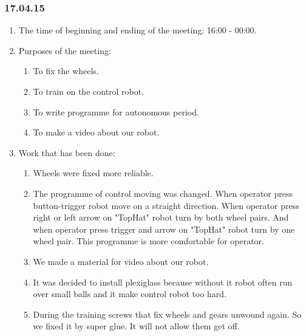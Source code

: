 \subsubsection{17.04.15}
\begin{enumerate}
	
	\item The time of beginning and ending of the meeting: 16:00 - 00:00.
	
	\item Purposes of the meeting: 
	\begin{enumerate}
		
		\item To fix the wheels.
		
		\item To train on the control robot.
		
		\item To write programme for autonomous period.
		
        \item To make a video about our robot.
		
	\end{enumerate}

	\item Work that has been done:
	\begin{enumerate}
		
		\item Wheels were fixed more reliable.
		
		\item The programme of control moving was changed. When operator press button-trigger robot move on a straight direction. When operator press right or left arrow on "TopHat" robot turn by both wheel pairs. And when operator press trigger and arrow on "TopHat" robot turn by one wheel pair. This programme is more comfortable for operator.
		
        \item We made a material for video about our robot.
        
        \item It was decided to install plexiglass because without it robot often run over small balls and it make control robot too hard.
        
        \item During the training screws that fix wheels and gears unwound again. So we fixed it by super glue. It will not allow them get off.
		

	\end{enumerate}
	

\end{enumerate}
